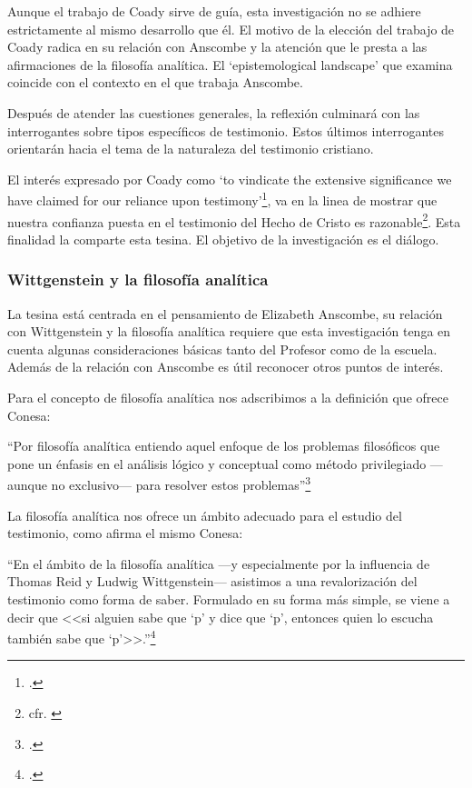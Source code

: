 \documentclass[12pt]{article}
\begin{document}
{Aunque el trabajo de Coady sirve de guía, esta investigación no se adhiere estrictamente al mismo desarrollo que él. El motivo de la elección del trabajo de Coady radica en su relación con Anscombe y la atención que le presta a las afirmaciones de la filosofía analítica. El `epistemological landscape' que examina coincide con el contexto en el que trabaja Anscombe.
 
Después de atender las cuestiones generales, la reflexión culminará con las interrogantes sobre tipos específicos de testimonio. Estos últimos interrogantes orientarán hacia el tema de la naturaleza del testimonio cristiano.

El interés expresado por Coady como `to vindicate the extensive significance we have claimed for our reliance upon testimony'\footcite{testcoady}, va en la linea de mostrar que nuestra confianza puesta en el testimonio del Hecho de Cristo es razonable\footnote{cfr. \cite[p.~267]{pradesmulticr}}. Esta finalidad la comparte esta tesina. El objetivo de la investigación es el diálogo.

\subsubsection{Wittgenstein y la filosofía analítica}

La tesina está centrada en el pensamiento de Elizabeth Anscombe, su relación con Wittgenstein y la filosofía analítica requiere que esta investigación tenga en cuenta algunas consideraciones básicas tanto del Profesor como de la escuela. Además de la relación con Anscombe es útil reconocer otros puntos de interés.

Para el concepto de filosofía analítica nos adscribimos a la definición que ofrece Conesa:

``Por filosofía analítica entiendo aquel enfoque de los problemas filosóficos que pone un énfasis en el análisis lógico y conceptual como método privilegiado \mbox{---aunque} no \mbox{exclusivo---} para resolver estos problemas''\footcite[p.~16]{cyc}

La filosofía analítica nos ofrece un ámbito adecuado para el estudio del testimonio, como afirma el mismo Conesa:

``En el ámbito de la filosofía analítica ---y especialmente por la influencia de Thomas Reid y Ludwig Wittgenstein--- asistimos a una revalorización del testimonio como forma de saber. Formulado en su forma más simple, se viene a decir que <<si alguien sabe que `p' y dice que `p', entonces quien lo escucha también sabe que `p'>>.''\footcite[p.~487]{feylogicaconesa}

}
\end{document}
